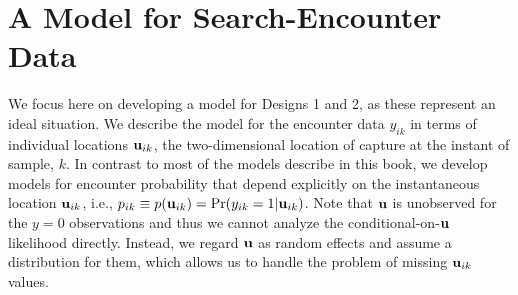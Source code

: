 \section{A Model for Search-Encounter Data}

We focus here on developing a model for Designs 1 and 2, as these
represent an ideal situation.  We describe the model for the encounter
data $y_{ik}$ in terms of individual locations ${\bf u}_{ik}$, the
two-dimensional location of capture at the instant of sample, $k$. In
contrast to most of the models describe in this book, we develop
models for encounter probability that depend explicitly on the
instantaneous location ${\bf u}_{ik}$, i.e., $p_{ik} \equiv p({\bf
  u}_{ik}) = \Pr(y_{ik}=1|{\bf u}_{ik})$.  Note that ${\bf u}$ is
unobserved for the $y=0$ observations and thus we cannot analyze the
conditional-on-${\bf u}$ likelihood directly. Instead, we regard ${\bf
  u}$ as random effects and assume a distribution for them, which
allows us to handle the problem of missing ${\bf u}_{ik}$ values.

